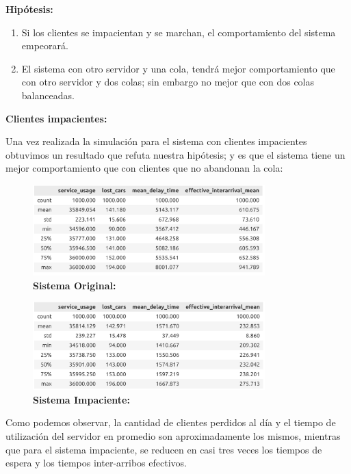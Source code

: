 \documentclass[14pt]{extarticle}
\begin{document}
\textbf{Hipótesis:}

\begin{enumerate}
    \item Si los clientes se impacientan y se marchan, el comportamiento del sistema empeorará.
    \item El sistema con otro servidor y una cola, tendrá mejor comportamiento que con otro servidor y dos colas; sin embargo no mejor que con dos colas balanceadas.
\end{enumerate} 

\textbf{Clientes impacientes:}

Una vez realizada la simulación para el sistema con clientes impacientes obtuvimos un resultado que refuta nuestra hipótesis; y es que el sistema tiene un mejor comportamiento que con clientes que no abandonan la cola:

\begin{figure}[htbp]
  \centering
  \includegraphics[width=0.8\textwidth]{./simple.png}
 \caption{\textbf{Sistema Original:}}
\end{figure}


\begin{figure}[htbp]
    \centering
    \includegraphics[width=0.8\textwidth]{./impatient.png}
   \caption{\textbf{Sistema Impaciente:}}
  \end{figure}

Como podemos observar, la cantidad de clientes perdidos al día y el tiempo de utilización del servidor en promedio son aproximadamente los mismos, mientras que para el sistema impaciente, se reducen en casi tres veces los tiempos de espera y los tiempos inter-arribos efectivos.
\end{document}
